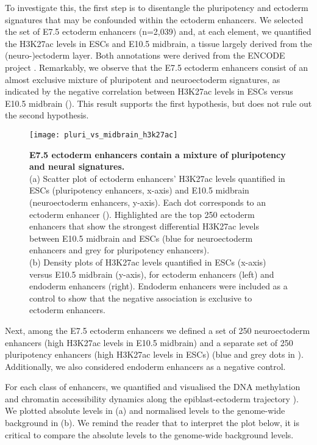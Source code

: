 To investigate this, the first step is to disentangle the pluripotency and ectoderm signatures that may be confounded within the ectoderm enhancers. We selected the set of E7.5 ectoderm enhancers (n=2,039) and, at each element, we quantified the H3K27ac levels in ESCs and E10.5 midbrain, a tissue largely derived from the (neuro-)ectoderm layer. Both annotations were derived from the ENCODE project \cite{Yue2014}. Remarkably, we observe that the E7.5 ectoderm enhancers consist of an almost exclusive mixture of pluripotent and neuroectoderm signatures, as indicated by the negative correlation between H3K27ac levels in ESCs versus E10.5 midbrain (). This result supports the first hypothesis, but does not rule out the second hypothesis.

\begin{figure}[H]
	\centering
	\texttt{[image: pluri\_vs\_midbrain\_h3k27ac]}
	\caption[]{
	\textbf{E7.5 ectoderm enhancers contain a mixture of pluripotency and neural signatures.}\\
	(a) Scatter plot of ectoderm enhancers' H3K27ac levels quantified in ESCs (pluripotency enhancers, x-axis) and E10.5 midbrain (neuroectoderm enhancers, y-axis). Each dot corresponds to an ectoderm enhancer (). Highlighted are the top 250 ectoderm enhancers that show the strongest differential H3K27ac levels between E10.5 midbrain and ESCs (blue for neuroectoderm enhancers and grey for pluripotency enhancers). \\
	(b)	Density plots of H3K27ac levels quantified in ESCs (x-axis) versus E10.5 midbrain (y-axis), for ectoderm enhancers (left) and endoderm enhancers (right). Endoderm enhancers were included as a control to show that the negative association is exclusive to ectoderm enhancers.
	}
	\label{fig:pluri_vs_midbrain_h3k27ac}
\end{figure}

Next, among the E7.5 ectoderm enhancers we defined a set of 250 neuroectoderm enhancers (high H3K27ac levels in E10.5 midbrain) and a separate set of 250 pluripotency enhancers (high H3K27ac levels in ESCs) (blue and grey dots in ). Additionally, we also considered endoderm enhancers as a negative control.

For each class of enhancers, we quantified and visualised the DNA methylation and chromatin accessibility dynamics along the epiblast-ectoderm trajectory ). We plotted absolute levels in (a) and normalised levels to the genome-wide background in (b). We remind the reader that to interpret the plot below, it is critical to compare the absolute levels to the genome-wide background levels.


